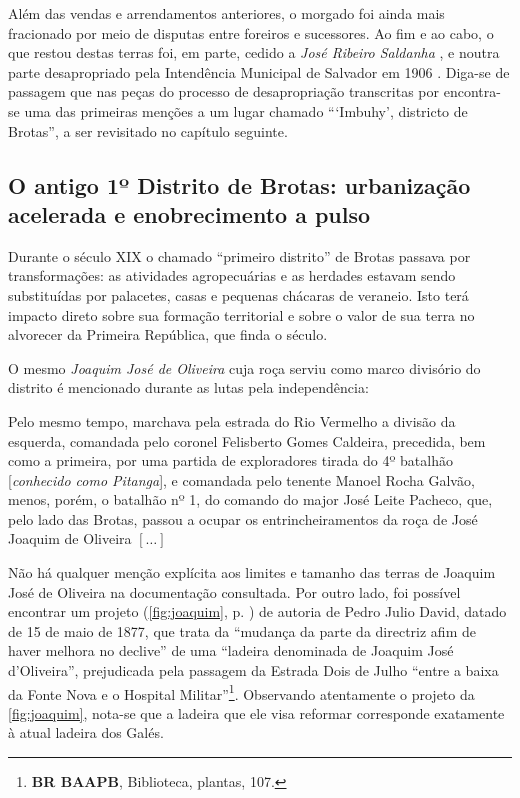 Além das vendas e arrendamentos anteriores, o morgado foi ainda mais fracionado por meio de disputas entre foreiros e sucessores. Ao fim e ao cabo, o que restou destas terras foi, em parte, cedido a \textit{José Ribeiro Saldanha}%
, e noutra parte desapropriado pela Intendência Municipal de Salvador em 1906 \cite[p.~III-13 - III-14]{teixeira_doacoes_1978}. Diga-se de passagem que nas peças do processo de desapropriação transcritas por  encontra-se uma das primeiras menções a um lugar chamado ```Imbuhy', districto de Brotas'', a ser revisitado no capítulo seguinte.


\subsection{O antigo 1º Distrito de Brotas: urbanização acelerada e enobrecimento a pulso}\label{subsec:pitangueiras}

Durante o século XIX o chamado ``primeiro distrito'' de Brotas passava por transformações: as atividades agropecuárias e as herdades estavam sendo substituídas por palacetes, casas e pequenas chácaras de veraneio. Isto terá impacto direto sobre sua formação territorial e sobre o valor de sua terra no alvorecer da Primeira República, que finda o século. 

O mesmo \textit{Joaquim José de Oliveira} cuja roça serviu como marco divisório do distrito é mencionado durante as lutas pela independência:

\begin{citacao}
Pelo mesmo tempo, marchava pela estrada do Rio Vermelho a divisão da esquerda, comandada pelo coronel Felisberto Gomes Caldeira, precedida, bem como a primeira, por uma partida de exploradores tirada do 4º batalhão [\textit{conhecido como Pitanga}], e comandada pelo tenente Manoel Rocha Galvão, menos, porém, o batalhão nº 1, do comando do major José Leite Pacheco, que, pelo lado das Brotas, passou a ocupar os entrincheiramentos da roça de José Joaquim de Oliveira \([\dots]\) \cite[p.~58]{vieira_memorias_1903}
\end{citacao}

Não há qualquer menção explícita aos limites e tamanho das terras de Joaquim José de Oliveira na documentação consultada. Por outro lado, foi possível encontrar um projeto (\autoref{fig:joaquim}, p. \pageref{fig:joaquim}) de autoria de Pedro Julio David, datado de 15 de maio de 1877, que trata da ``mudança da parte da directriz afim de haver melhora no declive'' de uma ``ladeira denominada de Joaquim José d'Oliveira'', prejudicada pela passagem da Estrada Dois de Julho ``entre a baixa da Fonte Nova e o Hospital Militar''\footnote{\textbf{BR BAAPB}, Biblioteca, plantas, 107.}. Observando atentamente o projeto da \autoref{fig:joaquim}, nota-se que a ladeira que ele visa reformar corresponde exatamente à atual ladeira dos Galés.

